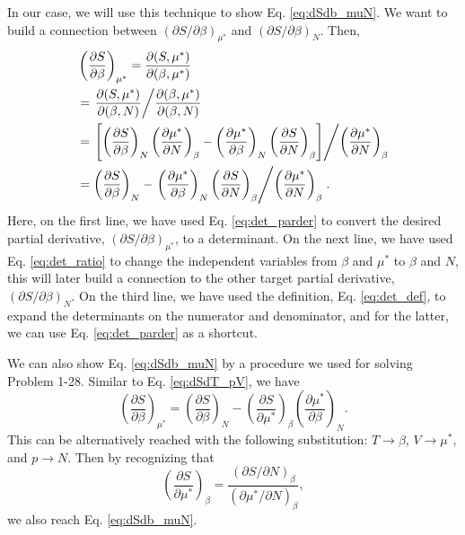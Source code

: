 \documentclass[twocolumn, 10pt]{article}
\numberwithin{equation}{section}
\begin{document}
In our case,
we will use this technique to show Eq. \eqref{eq:dSdb_muN}.
%
We want to build a connection between
$(\partial S/\partial \beta)_{\mu^*}$
and
$(\partial S/\partial \beta)_{N}$.
Then,
\begin{align*}
  &\left( \frac{ \partial S } {\partial \beta } \right)_{\mu^*}
  =
  \frac{ \partial (S, \mu^*) } { \partial (\beta, \mu^*) }
  \\
  &=
  \left.
  \frac{ \partial (S, \mu^*) } { \partial (\beta, N) }
  \middle/
  \frac{ \partial (\beta, \mu^*) } { \partial (\beta, N) }
  \right.
  \\
  &=
  \left.
  \left[
  \left( \frac{ \partial S } {\partial \beta } \right)_{N}
  \left( \frac{ \partial \mu^* } {\partial N } \right)_{\beta}
  -
  \left( \frac{ \partial \mu^* } {\partial \beta } \right)_{N}
  \left( \frac{ \partial S } {\partial N } \right)_{\beta}
  \right]
  \middle/
  \left( \frac{ \partial \mu^* } {\partial N } \right)_{\beta}
  \right.
  \\
  &=
  \left( \frac{ \partial S } {\partial \beta } \right)_{N}
  -
  \left.
  \left( \frac{ \partial \mu^* } {\partial \beta } \right)_{N}
  \left( \frac{ \partial S } {\partial N } \right)_{\beta}
  \middle/
  \left( \frac{ \partial \mu^* } {\partial N } \right)_{\beta}
  \right.
  .
\end{align*}
Here, on the first line, we have used Eq. \eqref{eq:det_parder}
to convert the desired partial derivative,
$(\partial S/\partial \beta)_{\mu^*}$,
to a determinant.
%
On the next line, we have used Eq. \eqref{eq:det_ratio}
to change the independent variables from $\beta$ and $\mu^*$
to $\beta$ and $N$,
this will later build a connection
to the other target partial derivative,
$(\partial S/\partial \beta)_N$.
%
On the third line, we have used the definition,
Eq. \eqref{eq:det_def},
to expand the determinants on the numerator and denominator,
and for the latter,
we can use Eq. \eqref{eq:det_parder} as a shortcut.
%

We can also show Eq. \eqref{eq:dSdb_muN}
by a procedure we used for solving Problem 1-28.
%
Similar to Eq. \eqref{eq:dSdT_pV}, we have
$$
  \left( \frac{ \partial S } {\partial \beta } \right)_{\mu^*}
  =
  \left( \frac{ \partial S } {\partial \beta } \right)_{N}
  -
  \left( \frac{ \partial S } {\partial \mu^* } \right)_{\beta}
  \left( \frac{ \partial \mu^* } {\partial \beta } \right)_{N}
  .
$$
This can be alternatively reached
with the following substitution:
$T \to \beta$, $V \to \mu^*$, and $p \to N$.
%
Then by recognizing that
$$
\left( \frac{ \partial S } { \partial \mu^* } \right)_\beta
=
\frac{
  (\partial S / \partial N)_{\beta}
} {
  (\partial \mu^* / \partial N)_{\beta}
},
$$
we also reach Eq. \eqref{eq:dSdb_muN}.
\end{document}
